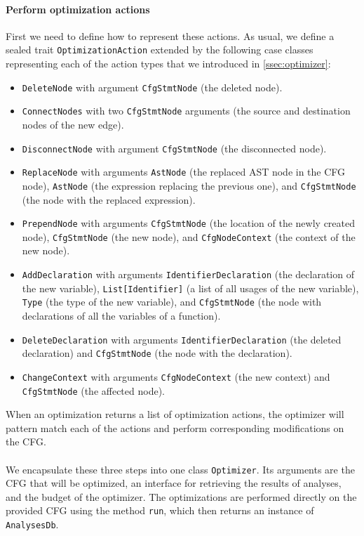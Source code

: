\documentclass[thesis=M,english]{FITthesis}[2019/12/23]
\begin{document}
\paragraph*{Perform optimization actions} First we need to define how to represent these actions. As usual, we define a sealed trait \texttt{OptimizationAction} extended by the following case classes representing each of the action types that we introduced in \autoref{ssec:optimizer}:
\begin{itemize}
    \item \texttt{DeleteNode} with argument \texttt{CfgStmtNode} (the deleted node).
    \item \texttt{ConnectNodes} with two \texttt{CfgStmtNode} arguments (the source and destination nodes of the new edge).
    \item \texttt{DisconnectNode} with argument \texttt{CfgStmtNode} (the disconnected node).
    \item \texttt{ReplaceNode} with arguments \texttt{AstNode} (the replaced AST node in the CFG node), \texttt{AstNode} (the expression replacing the previous one), and \texttt{CfgStmtNode} (the node with the replaced expression).
    \item \texttt{PrependNode} with arguments \texttt{CfgStmtNode} (the location of the newly created node), \texttt{CfgStmtNode} (the new node), and \texttt{CfgNodeContext} (the context of the new node).
    \item \texttt{AddDeclaration} with arguments \texttt{IdentifierDeclaration} (the declaration of the new variable), \texttt{List[Identifier]} (a list of all usages of the new variable), \texttt{Type} (the type of the new variable), and \texttt{CfgStmtNode} (the node with declarations of all the variables of a function).
    \item \texttt{DeleteDeclaration} with arguments \texttt{IdentifierDeclaration} (the de\-leted declaration) and \texttt{CfgStmtNode} (the node with the declaration).
    \item \texttt{ChangeContext} with arguments \texttt{CfgNodeContext} (the new context) and \texttt{CfgStmtNode} (the affected node).
\end{itemize}

When an optimization returns a list of optimization actions, the optimizer will pattern match each of the actions and perform corresponding modifications on the CFG.

\paragraph*{} We encapsulate these three steps into one class \texttt{Optimizer}. Its arguments are the CFG that will be optimized, an interface for retrieving the results of analyses, and the budget of the optimizer. The optimizations are performed directly on the provided CFG using the method \texttt{run}, which then returns an instance of \texttt{AnalysesDb}. 
\end{document}
